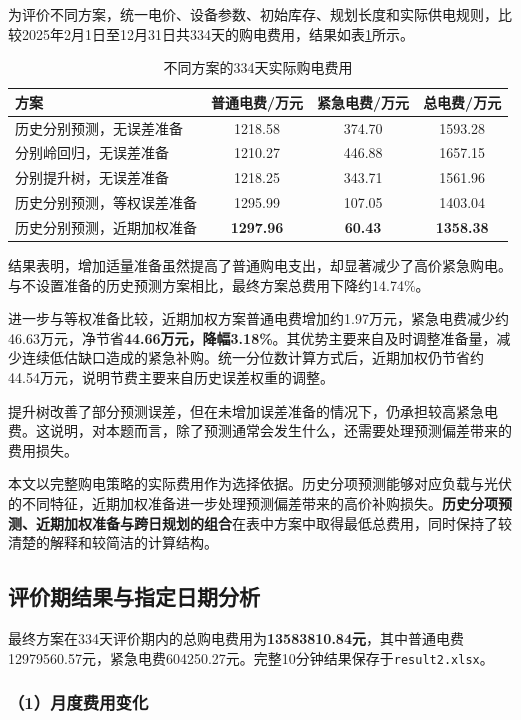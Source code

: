 为评价不同方案，统一电价、设备参数、初始库存、规划长度和实际供电规则，比较2025年2月1日至12月31日共334天的购电费用，结果如表\ref{tab:q2_model_compare}所示。

\begin{table}[htbp]
\centering
\caption{不同方案的334天实际购电费用}
\label{tab:q2_model_compare}
\begin{tabular}{lccc}
\hline
方案 & 普通电费/万元 & 紧急电费/万元 & 总电费/万元 \\
\hline
历史分别预测，无误差准备
& 1218.58 & 374.70 & 1593.28 \\
分别岭回归，无误差准备
& 1210.27 & 446.88 & 1657.15 \\
分别提升树，无误差准备
& 1218.25 & 343.71 & 1561.96 \\
历史分别预测，等权误差准备
& 1295.99 & 107.05 & 1403.04 \\
历史分别预测，近期加权准备
& \textbf{1297.96} & \textbf{60.43} & \textbf{1358.38} \\
\hline
\end{tabular}
\end{table}

结果表明，增加适量准备虽然提高了普通购电支出，却显著减少了高价紧急购电。与不设置准备的历史预测方案相比，最终方案总费用下降约14.74\%。

进一步与等权准备比较，近期加权方案普通电费增加约1.97万元，紧急电费减少约46.63万元，净节省\textbf{44.66万元，降幅3.18\%}。其优势主要来自及时调整准备量，减少连续低估缺口造成的紧急补购。统一分位数计算方式后，近期加权仍节省约44.54万元，说明节费主要来自历史误差权重的调整。

提升树改善了部分预测误差，但在未增加误差准备的情况下，仍承担较高紧急电费。这说明，对本题而言，除了预测通常会发生什么，还需要处理预测偏差带来的费用损失。

本文以完整购电策略的实际费用作为选择依据。历史分项预测能够对应负载与光伏的不同特征，近期加权准备进一步处理预测偏差带来的高价补购损失。\textbf{历史分项预测、近期加权准备与跨日规划的组合}在表中方案中取得最低总费用，同时保持了较清楚的解释和较简洁的计算结构。

\subsection{评价期结果与指定日期分析}

最终方案在334天评价期内的总购电费用为\textbf{13583810.84元}，其中普通电费12979560.57元，紧急电费604250.27元。完整10分钟结果保存于\texttt{result2.xlsx}。

\subsubsection*{（1）月度费用变化}

